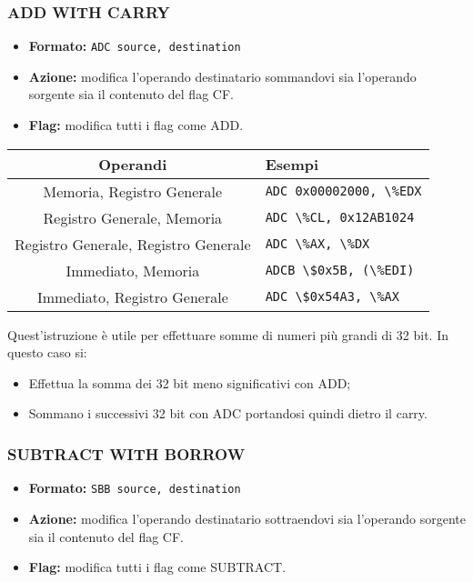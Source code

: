 \documentclass[a4paper,11pt]{article}
\begin{document}
\subsubsection{ADD WITH CARRY}
\begin{itemize}
	\item \textbf{Formato:} \lstinline|ADC source, destination|
	\item \textbf{Azione:} modifica l'operando destinatario sommandovi sia l'operando sorgente sia il contenuto del flag CF.
	\item \textbf{Flag:} modifica tutti i flag come ADD. 
\end{itemize}

\begin{table}[h!]
			\center {}
			\begin{tabular} { c | p{5cm} }
				\bfseries Operandi & \bfseries Esempi \\
				\hline
				Memoria, Registro Generale & \lstinline|ADC 0x00002000, \%EDX| \\ 
				Registro Generale, Memoria & \lstinline|ADC \%CL, 0x12AB1024| \\ 
				Registro Generale, Registro Generale & \lstinline|ADC \%AX, \%DX| \\ 
				Immediato, Memoria & \lstinline|ADCB \$0x5B, (\%EDI)| \\ 
				Immediato, Registro Generale & \lstinline|ADC \$0x54A3, \%AX|
			\end{tabular}
		\end{table}

Quest'istruzione è utile per effettuare somme di numeri più grandi di 32 bit.
In questo caso si:
\begin{itemize}
	\item Effettua la somma dei 32 bit meno significativi con ADD;
	\item Sommano i successivi 32 bit con ADC portandosi quindi dietro il carry.
\end{itemize}

\subsubsection{SUBTRACT WITH BORROW}
\begin{itemize}
	\item \textbf{Formato:} \lstinline|SBB source, destination|
	\item \textbf{Azione:} modifica l'operando destinatario sottraendovi sia l'operando sorgente sia il contenuto del flag CF.
	\item \textbf{Flag:} modifica tutti i flag come SUBTRACT. 
\end{itemize}
\end{document}
